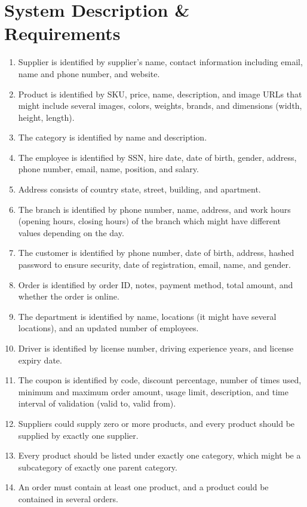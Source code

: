 
\section{System Description \& Requirements}

\begin{enumerate}
  \item Supplier is identified by supplier's name, contact information including email, name and phone number, and website.
  \item Product is identified by SKU, price, name, description, and image URLs that might include several images, colors, weights, brands, and dimensions (width, height, length).
  \item The category is identified by name and description.
  \item The employee is identified by SSN, hire date, date of birth, gender, address, phone number, email, name, position, and salary.
  \item Address consists of country state, street, building, and apartment.
  \item The branch is identified by phone number, name, address, and work hours (opening hours, closing hours) of the branch which might have different values depending on the day.
  \item The customer is identified by phone number, date of birth, address, hashed password to ensure security, date of registration, email, name, and gender.
  \item Order is identified by order ID, notes, payment method, total amount, and whether the order is online.
  \item The department is identified by name, locations (it might have several locations), and an updated number of employees.
  \item Driver is identified by license number, driving experience years, and license expiry date.
  \item The coupon is identified by code, discount percentage, number of times used, minimum and maximum order amount, usage limit, description, and time interval of validation (valid to, valid from).
  \item Suppliers could supply zero or more products, and every product should be supplied by exactly one supplier.
  \item Every product should be listed under exactly one category, which might be a subcategory of exactly one parent category.
  \item An order must contain at least one product, and a product could be contained in several orders.

\end{enumerate}
